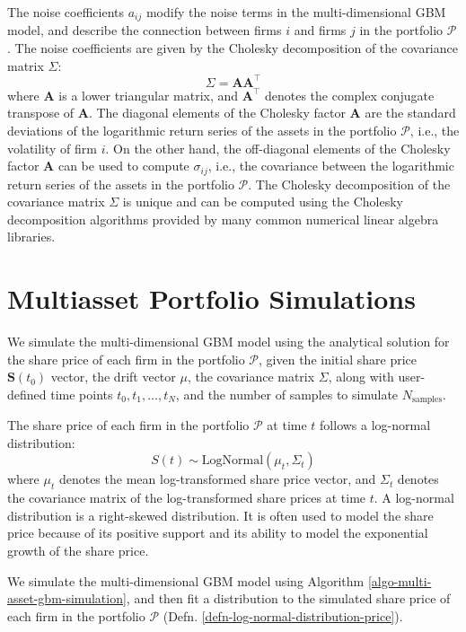 \documentclass[11pt]{article}
\theoremstyle{definition}
\begin{document}
The noise coefficients $a_{ij}$ modify the noise terms in the multi-dimensional GBM model, 
and describe the connection between firms $i$ and firms $j$ in the portfolio $\mathcal{P}$. 
The noise coefficients are given by the Cholesky decomposition of the covariance matrix $\Sigma$:
\begin{equation*}
\Sigma = \mathbf{A}\mathbf{A}^{\top}
\end{equation*}
where $\mathbf{A}$ is a lower triangular matrix, and $\mathbf{A}^{\top}$ denotes the complex conjugate transpose of $\mathbf{A}$. The diagonal elements of the Cholesky factor $\mathbf{A}$ are the standard deviations of the logarithmic return series of the assets in the portfolio $\mathcal{P}$, i.e., the volatility of firm $i$. On the other hand, the off-diagonal elements of the Cholesky factor $\mathbf{A}$ can be used to compute $\sigma_{ij}$, i.e., the covariance between the logarithmic return series of the assets in the portfolio $\mathcal{P}$. The Cholesky decomposition of the covariance matrix $\Sigma$ is unique and can be computed using the Cholesky decomposition algorithms provided by many common numerical linear algebra libraries.


\section*{Multiasset Portfolio Simulations}
We simulate the multi-dimensional GBM model using the analytical solution for the share price of each firm in the portfolio $\mathcal{P}$, given the initial share price $\mathbf{S}(t_{0})$ vector, the drift vector $\mu$, the covariance matrix $\Sigma$, along with user-defined time points $t_{0},t_{1},\dots,t_{N}$, and the number of samples to simulate $N_{\text{samples}}$. 

\begin{definition}\label{defn-log-normal-distribution-price}
The share price of each firm in the portfolio $\mathcal{P}$ at time $t$ follows a log-normal distribution:
\begin{equation*}
S(t)\sim\text{LogNormal}\left(\mu_{t},\Sigma_{t}\right)
\end{equation*}
where $\mu_{t}$ denotes the mean log-transformed share price vector, and $\Sigma_{t}$ denotes the covariance matrix of the log-transformed share prices at time $t$. A log-normal distribution is a right-skewed distribution. It is often used to model the share price because of its positive support and its ability to model the exponential growth of the share price.
\end{definition}
We simulate the multi-dimensional GBM model using Algorithm \ref{algo-multi-asset-gbm-simulation}, and then fit a distribution to the simulated share price of each firm in the portfolio $\mathcal{P}$ (Defn. \ref{defn-log-normal-distribution-price}).
\end{document}
